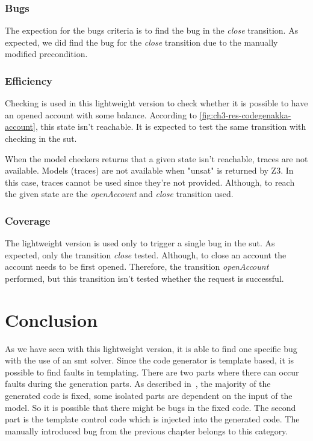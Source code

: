 \subsubsection{Bugs}
The expection for the bugs criteria is to find the bug in the \textit{close} transition.
As expected, we did find the bug for the \textit{close}
transition due to the manually modified precondition.

\subsubsection{Efficiency}

Checking is used in this lightweight version to check whether it is possible
to have an opened account with some balance. According to
\autoref{fig:ch3-res-codegenakka-account}, this state isn't reachable. It is
expected to test the same transition with checking in the \gls{sut}.

When the model checkers returns that a given state isn't reachable,
traces are not available. Models (traces) are not available when "unsat" is
returned by Z3.
In this case, traces cannot be used since they're not provided. Although, to
reach the given state are the \textit{openAccount} and \textit{close} transition
used.


\subsubsection{Coverage}
The lightweight version is used only to trigger a single bug in the \gls{sut}. As
expected, only the transition \textit{close} tested. Although, to close an
account the account needs to be first opened. Therefore, the transition
\textit{openAccount} performed, but this transition isn't tested whether the
request is successful.

\section{Conclusion}

As we have seen with this lightweight version, it is able to find one specific bug with the use of an \gls{smt} solver. Since the code generator is template based, it is possible to find faults in templating. There are two parts where there can occur faults during the generation parts. As described in~\cite[p.274]{voelter2013dsl}, the majority of the generated code is fixed, some isolated parts are dependent on the input of the model. So it is possible that there might be bugs in the fixed code. The second part is the template control code which is injected into the generated code. The manually introduced bug from the previous chapter belongs  to this category.


